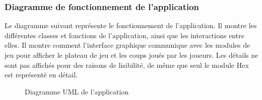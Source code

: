 \subsubsection{Diagramme de fonctionnement de l'application}

Le diagramme suivant représente le fonctionnement de l'application. Il montre les différentes
classes et fonctions de l'application, ainsi que les interactions entre elles.
Il montre comment l'interface graphique communique avec les modules de jeu pour afficher
le plateau de jeu et les coups joués par les joueurs. Les détails ne sont pas affichés
pour des raisons de lisibilité, de même que seul le module Hex est représenté en détail.

\begin{figure}[!htb]
    \centering
    \caption{Diagramme UML de l'application}\label{Fig:UML_app}
\end{figure}

